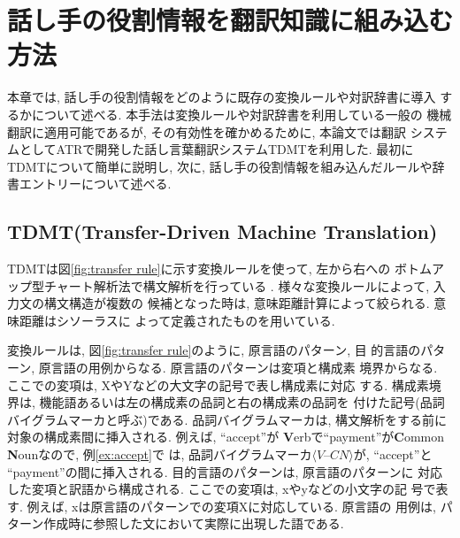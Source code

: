 \section{話し手の役割情報を翻訳知識に組み込む方法}

本章では, 話し手の役割情報をどのように既存の変換ルールや対訳辞書に導入
するかについて述べる. 本手法は変換ルールや対訳辞書を利用している一般の
機械翻訳に適用可能であるが, その有効性を確かめるために, 本論文では翻訳
システムとしてATRで開発した話し言葉翻訳システムTDMTを利用した. 最初に
TDMTについて簡単に説明し, 次に, 話し手の役割情報を組み込んだルールや辞
書エントリーについて述べる.

\subsection{TDMT(Transfer-Driven Machine Translation)}

TDMTは図\ref{fig:transfer rule}に示す変換ルールを使って, 左から右への
ボトムアップ型チャート解析法で構文解析を行っている
\cite{Furuse:1999}. 様々な変換ルールによって, 入力文の構文構造が複数の
候補となった時は, 意味距離計算によって絞られる. 意味距離はシソーラスに
よって定義されたものを用いている.

変換ルールは, 図\ref{fig:transfer rule}のように, 原言語のパターン, 目
的言語のパターン, 原言語の用例からなる. 原言語のパターンは変項と構成素
境界からなる. ここでの変項は, XやYなどの大文字の記号で表し構成素に対応
する. 構成素境界は, 機能語あるいは左の構成素の品詞と右の構成素の品詞を
付けた記号(品詞バイグラムマーカと呼ぶ)である. 品詞バイグラムマーカは, 
構文解析をする前に対象の構成素間に挿入される. 例えば, ``accept''が{\bf
V}erbで``payment''が{\bf C}ommon {\bf N}ounなので, 例\ref{ex:accept}で
は, 品詞バイグラムマーカ$\langle V$--$CN\rangle$が, ``accept''と
``payment''の間に挿入される. 目的言語のパターンは, 原言語のパターンに
対応した変項と訳語から構成される. ここでの変項は, xやyなどの小文字の記
号で表す. 例えば, xは原言語のパターンでの変項Xに対応している. 原言語の
用例は, パターン作成時に参照した文において実際に出現した語である.

\begin{center}
\end{center}

